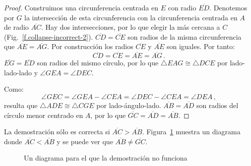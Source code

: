 \begin{proof}
\enlargethispage{\baselineskip}

Construimos una circunferencia centrada en $E$ con radio $\overline{ED}$. Denotemos por $G$ la intersección de esta circunferencia con la circunferencia centrada en $A$ de radio $\overline{AC}$. Hay dos intersecciones, por lo que elegir la más cercana a $C$ (Fig.~\ref{f.collapse-incorrect-2}).
$\overline{CD}=\overline{CE}$ son radios de la misma circunferencia que $\overline{AE}=\overline{AG}$. Por construcción los radios $\overline{CE}$ y $\overline{AE}$ son iguales. Por tanto:
\[
\overline{CD} = \overline{CE} = \overline{AE} = \overline{AG}\,.
\]
$\overline{EG} = \overline{ED}$ son radios del mismo círculo, por lo que $\triangle EAG\cong \triangle DCE$ por lado-lado-lado y $\angle GEA = \angle DEC$.

Como:
\[
\angle GEC = \angle GEA \!-\!\angle CEA = \angle DEC\!-\!\angle CEA = \angle DEA\,,
\]
resulta que $\triangle ADE\cong\triangle CGE$ por lado-ángulo-lado. $\overline{AB}=\overline{AD}$ son radios del círculo menor centrado en $A$, por lo que $\overline{GC}=\overline{AD}=\overline{AB}$.
\end{proof}

La demostración sólo es correcta si $\overline{AC}>\overline{AB}$.  Figura~\ref{f.collapse-incorrect-4} muestra un diagrama donde $\overline{AC}<\overline{AB}$ y se puede ver que $\overline{AB}\neq\overline{GC}$.

\begin{figure}[t]
\begin{center}
\end{center}
\caption{Un diagrama para el que la demostración no funciona}\label{f.collapse-incorrect-4}
\end{figure}

